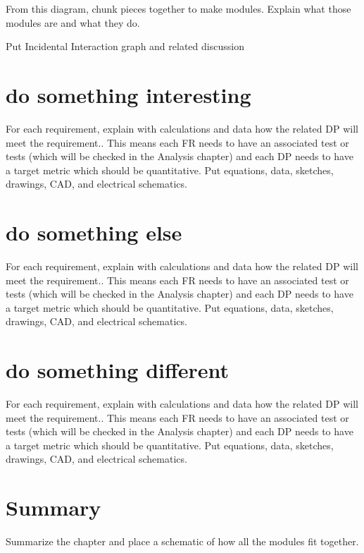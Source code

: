 From this diagram, chunk pieces together to make modules.
Explain what those modules are and what they do.

Put Incidental Interaction graph and related discussion

\section{ do something interesting}
For each requirement, explain with calculations and data how the related DP will meet the requirement..
This means each FR needs to have an associated test or tests (which will be checked in the Analysis chapter) and each DP needs to have a target metric which should be quantitative.
Put equations, data, sketches, drawings, CAD, and electrical schematics.

\section{ do something else}
For each requirement, explain with calculations and data how the related DP will meet the requirement..
This means each FR needs to have an associated test or tests (which will be checked in the Analysis chapter) and each DP needs to have a target metric which should be quantitative.
Put equations, data, sketches, drawings, CAD, and electrical schematics.


\section{ do something different}
For each requirement, explain with calculations and data how the related DP will meet the requirement..
This means each FR needs to have an associated test or tests (which will be checked in the Analysis chapter) and each DP needs to have a target metric which should be quantitative.
Put equations, data, sketches, drawings, CAD, and electrical schematics.

\section{Summary}
Summarize the chapter and place a schematic of how all the modules fit together.

